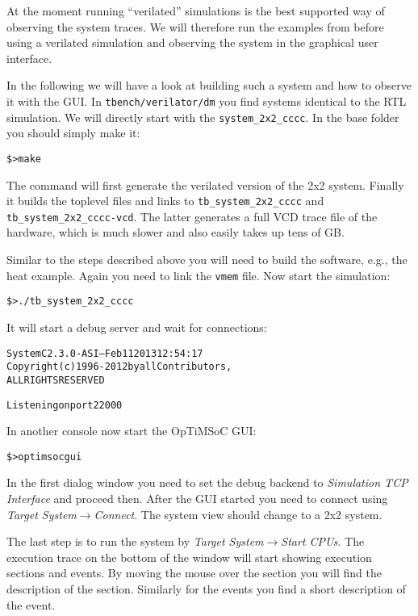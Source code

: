 At the moment running ``verilated'' simulations is the best supported
way of observing the system traces. We will therefore run the examples
from before using a verilated simulation and observing the system in
the graphical user interface.

In the following we will have a look at building such a system and how
to observe it with the GUI. In \verb|tbench/verilator/dm| you find
systems identical to the RTL simulation. We will directly start with
the \verb|system_2x2_cccc|. In the base folder you should simply make
it:

\begin{alltt}
\$> make
\end{alltt}

The command will first generate the verilated version of the 2x2
system. Finally it builds the toplevel files and links to
\verb|tb_system_2x2_cccc| and \verb|tb_system_2x2_cccc-vcd|. The
latter generates a full VCD trace file of the hardware, which is
much slower and also easily takes up tens of GB.

Similar to the steps described above you will need to build the
software, e.g., the heat example. Again you need to link the
\verb|vmem| file. Now start the simulation:

\begin{alltt}
\$> ./tb_system_2x2_cccc
\end{alltt}

It will start a debug server and wait for connections:

\begin{alltt}

             SystemC 2.3.0-ASI --- Feb 11 2013 12:54:17
        Copyright (c) 1996-2012 by all Contributors,
        ALL RIGHTS RESERVED

Listening on port 22000
\end{alltt}

In another console now start the OpTiMSoC GUI:

\begin{alltt}
\$> optimsocgui
\end{alltt}

In the first dialog window you need to set the debug backend to
\emph{Simulation TCP Interface} and proceed then. After the GUI
started you need to connect using \emph{Target
  System}$\rightarrow$\emph{Connect}. The system view should change to
a 2x2 system.

The last step is to run the system by \emph{Target
  System}$\rightarrow$\emph{Start CPUs}. The execution trace on the
bottom of the window will start showing execution sections and events.
By moving the mouse over the section you will find the description of
the section. Similarly for the events you find a short description of
the event.

